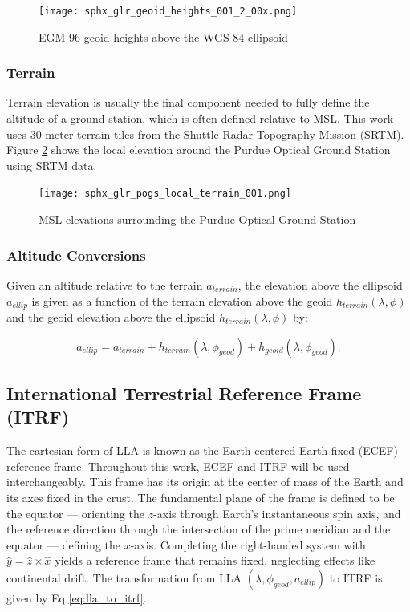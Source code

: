 \begin{figure}[ht]
  \centering
  \texttt{[image: sphx\_glr\_geoid\_heights\_001\_2\_00x.png]}
  \caption{EGM-96 geoid heights above the WGS-84 ellipsoid}
  \label{fig:geoid_shape}
\end{figure}

\subsubsection{Terrain}

Terrain elevation is usually the final component needed to fully define the altitude of a ground station, which is often defined relative to MSL. This work uses $30$-meter terrain tiles from the Shuttle Radar Topography Mission (SRTM). Figure \ref{fig:pogs_terrain} shows the local elevation around the Purdue Optical Ground Station using SRTM data.

\begin{figure}[ht]
  \centering
  \texttt{[image: sphx\_glr\_pogs\_local\_terrain\_001.png]}
  \caption{MSL elevations surrounding the Purdue Optical Ground Station}
  \label{fig:pogs_terrain}
\end{figure}

\subsubsection{Altitude Conversions}

Given an altitude relative to the terrain $a_{terrain}$, the elevation above the ellipsoid $a_{ellip}$ is given as a function of the terrain elevation above the geoid $h_{terrain}(\lambda, \phi)$ and the geoid elevation above the ellipsoid $h_{terrain}(\lambda, \phi)$ by:

\begin{equation} \label{eq:altitude_above_ellipsoid}
  a_{ellip} = a_{terrain} + h_{terrain}(\lambda, \phi_{geod}) + h_{geoid}(\lambda, \phi_{geod}).
\end{equation}

\subsection{International Terrestrial Reference Frame (ITRF)}

The cartesian form of LLA is known as the Earth-centered Earth-fixed (ECEF) reference frame. Throughout this work, ECEF and ITRF will be used interchangeably. This frame has its origin at the center of mass of the Earth and its axes fixed in the crust. The
fundamental plane of the frame is defined to be the equator ---  orienting the $z$-axis through Earth's
instantaneous spin axis, and the reference direction through the intersection of the prime meridian
and the equator ---  defining the $x$-axis. Completing the right-handed system with $\hat{y} = \hat{z} \times \hat{x}$ yields a
reference frame that remains fixed, neglecting effects like continental drift. The transformation from LLA $\left( \lambda, \phi_{geod}, a_{ellip} \right)$ to ITRF is given by Eq \ref{eq:lla_to_itrf}.

